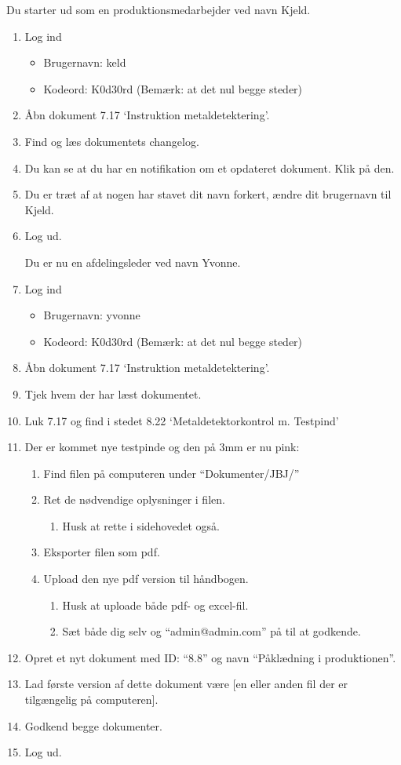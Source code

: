 Du starter ud som en produktionsmedarbejder ved navn Kjeld.
\begin{enumerate}
	\item Log ind
		\begin{itemize}
			\item Brugernavn: keld
			\item Kodeord: K0d30rd  (Bemærk: at det nul begge steder)
		\end{itemize}
	\item Åbn dokument 7.17 ‘Instruktion metaldetektering’.
	\item Find og læs dokumentets changelog.
	\item Du kan se at du har en notifikation om et opdateret dokument. Klik på den.
	\item Du er træt af at nogen har stavet dit navn forkert, ændre dit brugernavn til Kjeld.
	\item Log ud.

Du er nu en afdelingsleder ved navn Yvonne.
	\item Log ind
		\begin{itemize}
			\item Brugernavn: yvonne
			\item Kodeord: K0d30rd  (Bemærk: at det nul begge steder)
		\end{itemize}
	\item Åbn dokument 7.17 ‘Instruktion metaldetektering’.
	\item Tjek hvem der har læst dokumentet.
	\item Luk 7.17 og find i stedet 8.22 ‘Metaldetektorkontrol m. Testpind’
	\item Der er kommet nye testpinde og den på 3mm er nu pink:
		\begin{enumerate}
			\item Find filen på computeren under “Dokumenter/JBJ/”
			\item Ret de nødvendige oplysninger i filen.
			\begin{enumerate}
				\item Husk at rette i sidehovedet også.
			\end{enumerate}
		\item Eksporter filen som pdf.
		\item Upload den nye pdf version til håndbogen.
			\begin{enumerate}
				\item Husk at uploade både pdf- og excel-fil.
				\item Sæt både dig selv og “admin@admin.com” på til at godkende.
			\end{enumerate}
		\end{enumerate}
	\item Opret et nyt dokument med ID: “8.8” og navn “Påklædning i produktionen”.
	\item Lad første version af dette dokument være [en eller anden fil der er tilgængelig på computeren].
	\item Godkend begge dokumenter.
	\item Log ud.


\end{enumerate}
